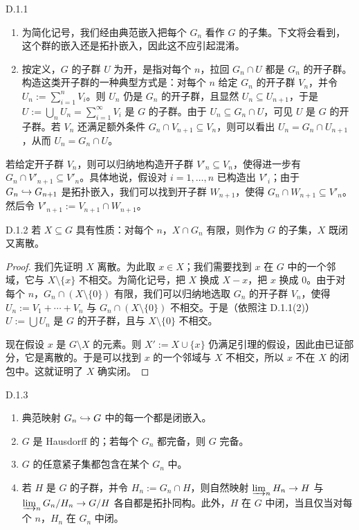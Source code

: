\begin{rem}{D.1.1}\label{thm:a4-19-19}
\begin{enumerate}[label=(\arabic*)]
\item 为简化记号，我们经由典范嵌入把每个 $G_n$ 看作 $G$ 的子集。下文将会看到，这个群的嵌入还是拓扑嵌入，因此这不应引起混淆。
\item 按定义，$G$ 的子群 $U$ 为开，是指对每个 $n$，拉回 $G_n\cap U$ 都是 $G_n$ 的开子群。构造这类开子群的一种典型方式是：对每个 $n$ 给定 $G_n$ 的开子群 $V_n$，并令 $U_n:=\sum_{i=1}^n V_i$。则 $U_n$ 仍是 $G_n$ 的开子群，且显然 $U_n\subseteq U_{n+1}$，于是 $U:=\bigcup_n U_n=\sum_{i=1}^\infty V_i$ 是 $G$ 的子群。由于 $U_n\subseteq G_n\cap U$，可见 $U$ 是 $G$ 的开子群。若 $V_n$ 还满足额外条件 $G_n\cap V_{n+1}\subseteq V_n$，则可以看出 $U_n=G_n\cap U_{n+1}$，从而 $U_n=G_n\cap U$。
\end{enumerate}

若给定开子群 $V_n$，则可以归纳地构造开子群 $V'_n\subseteq V_n$，使得进一步有 $G_n\cap V'_{n+1}\subseteq V'_n$。具体地说，假设对 $i=1,\dots,n$ 已构造出 $V'_i$；由于 $G_n\hookrightarrow G_{n+1}$ 是拓扑嵌入，我们可以找到开子群 $W_{n+1}$，使得 $G_n\cap W_{n+1}\subseteq V'_n$。然后令 $V'_{n+1}:=V_{n+1}\cap W_{n+1}$。
\end{rem}

\begin{lem}{D.1.2}\label{thm:a4-19-20}
若 $X\subseteq G$ 具有性质：对每个 $n$，$X\cap G_n$ 有限，则作为 $G$ 的子集，$X$ 既闭又离散。
\end{lem}

\begin{proof}
我们先证明 $X$ 离散。为此取 $x\in X$；我们需要找到 $x$ 在 $G$ 中的一个邻域，它与 $X\setminus\{x\}$ 不相交。为简化记号，把 $X$ 换成 $X-x$，把 $x$ 换成 $0$。由于对每个 $n$，$G_n\cap(X\setminus\{0\})$ 有限，我们可以归纳地选取 $G_n$ 的开子群 $V_n$，使得 $U_n:=V_1+\cdots+V_n$ 与 $G_n\cap(X\setminus\{0\})$ 不相交。于是（依照注 D.1.1(2)）$U:=\bigcup U_n$ 是 $G$ 的开子群，且与 $X\setminus\{0\}$ 不相交。


现在假设 $x$ 是 $G\setminus X$ 的元素。则 $X':=X\cup\{x\}$ 仍满足引理的假设，因此由已证部分，它是离散的。于是可以找到 $x$ 的一个邻域与 $X$ 不相交，所以 $x$ 不在 $X$ 的闭包中。这就证明了 $X$ 确实闭。
\end{proof}

\begin{prop}{D.1.3}\label{thm:a4-19-21}
\begin{enumerate}[label=(\arabic*)]
\item 典范映射 $G_n\hookrightarrow G$ 中的每一个都是闭嵌入。
\item $G$ 是 Hausdorff 的；若每个 $G_n$ 都完备，则 $G$ 完备。
\item $G$ 的任意紧子集都包含在某个 $G_n$ 中。
\item 若 $H$ 是 $G$ 的子群，并令 $H_n:=G_n\cap H$，则自然映射 $\varinjlim_n H_n\to H$ 与 $\varinjlim_n G_n/H_n\to G/H$ 各自都是拓扑同构。此外，$H$ 在 $G$ 中闭，当且仅当对每个 $n$，$H_n$ 在 $G_n$ 中闭。
\end{enumerate}
\end{prop}

